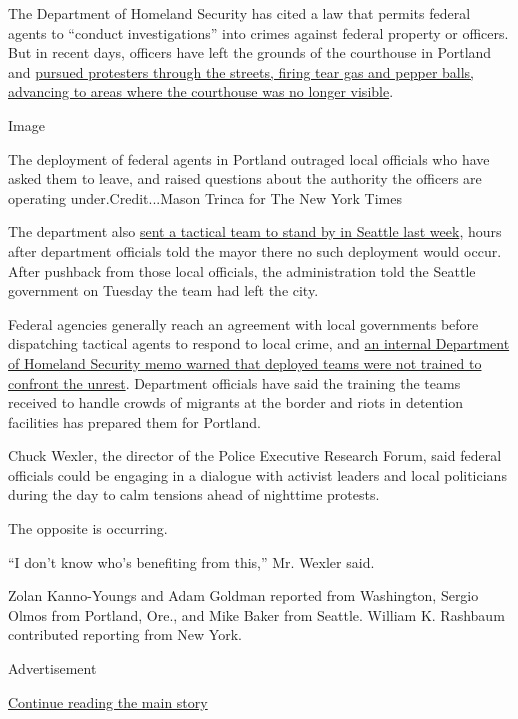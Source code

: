 The Department of Homeland Security has cited a law that permits federal
agents to ``conduct investigations'' into crimes against federal
property or officers. But in recent days, officers have left the grounds
of the courthouse in Portland and
\href{https://www.nytimes3xbfgragh.onion/2020/07/25/us/portland-federal-legal-jurisdiction-courts.html}{pursued
protesters through the streets, firing tear gas and pepper balls,
advancing to areas where the courthouse was no longer visible}.

Image

The deployment of federal agents in Portland outraged local officials
who have asked them to leave, and raised questions about the authority
the officers are operating under.Credit...Mason Trinca for The New York
Times

The department also
\href{https://www.nytimes3xbfgragh.onion/2020/07/23/us/seattle-protests-feds.html}{sent
a tactical team to stand by in Seattle last week}, hours after
department officials told the mayor there no such deployment would
occur. After pushback from those local officials, the administration
told the Seattle government on Tuesday the team had left the city.

Federal agencies generally reach an agreement with local governments
before dispatching tactical agents to respond to local crime, and
\href{https://www.nytimes3xbfgragh.onion/2020/07/18/us/portland-protests.html}{an
internal Department of Homeland Security memo warned that deployed teams
were not trained to confront the unrest}. Department officials have said
the training the teams received to handle crowds of migrants at the
border and riots in detention facilities has prepared them for Portland.

Chuck Wexler, the director of the Police Executive Research Forum, said
federal officials could be engaging in a dialogue with activist leaders
and local politicians during the day to calm tensions ahead of nighttime
protests.

The opposite is occurring.

``I don't know who's benefiting from this,'' Mr. Wexler said.

Zolan Kanno-Youngs and Adam Goldman reported from Washington, Sergio
Olmos from Portland, Ore., and Mike Baker from Seattle. William K.
Rashbaum contributed reporting from New York.

Advertisement

\protect\hyperlink{after-bottom}{Continue reading the main story}

